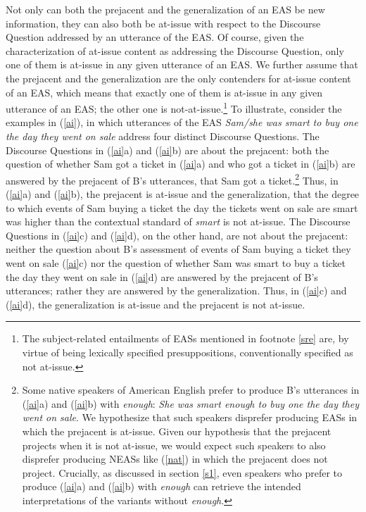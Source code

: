 \documentclass[11pt,fleqn]{article}
\newcommand{\6}{\mbox{$[\hspace*{-.6mm}[$}}
\newcommand{\9}{\mbox{$]\hspace*{-.6mm}]$}}
\begin{document}
Not only can both the prejacent and the generalization of an EAS be new information, they can also both be at-issue with respect to the Discourse Question addressed by an utterance of the EAS. Of course, given the characterization of at-issue content as addressing the Discourse Question, only one of them is at-issue in any given utterance of an EAS. We further assume that the prejacent and the generalization are the only contenders for at-issue content of an EAS, which means that exactly one of them is at-issue in any given utterance of an EAS; the other one is not-at-issue.\footnote{The subject-related entailments of EASs mentioned in footnote \ref{sre} are, by virtue of being lexically specified presuppositions, conventionally specified as not at-issue.} To illustrate, consider the examples in (\ref{ai}), in which utterances of the EAS {\em Sam/she was smart to buy one the day they went on sale} address four distinct Discourse Questions. The Discourse Questions in (\ref{ai}a) and (\ref{ai}b) are about the prejacent: both the question of whether Sam got a ticket in (\ref{ai}a) and who got a ticket in (\ref{ai}b) are answered by the prejacent of B's utterances, that Sam got a ticket.\footnote{Some native speakers of American English prefer to produce B's utterances in (\ref{ai}a) and (\ref{ai}b) with {\em enough}: {\em She was smart enough to buy one the day they went on sale}. We hypothesize that such speakers disprefer producing EASs in which the prejacent is at-issue. Given our hypothesis that the prejacent projects when it is not at-issue, we would expect such speakers to also disprefer producing NEASs like (\ref{nat}) in which the prejacent does not project. Crucially, as discussed in section \ref{s1}, even speakers who prefer to produce (\ref{ai}a) and (\ref{ai}b) with {\em enough} can retrieve the intended interpretations of the variants without {\em enough}.} Thus, in (\ref{ai}a) and (\ref{ai}b), the prejacent is at-issue and the generalization, that the degree to which events of Sam buying a ticket the day the tickets went on sale are smart was higher than the contextual standard of {\em smart} is not at-issue. The Discourse Questions in (\ref{ai}c) and (\ref{ai}d), on the other hand, are not about the prejacent:  neither the question about B's assessment of events of Sam buying a ticket they went on sale (\ref{ai}c) nor the question of whether Sam was smart to buy a ticket the day they went on sale in (\ref{ai}d) are answered by the prejacent of B's utterances; rather they are answered by the generalization. Thus, in (\ref{ai}c) and (\ref{ai}d), the generalization is at-issue and the prejacent is not at-issue.
\end{document}
